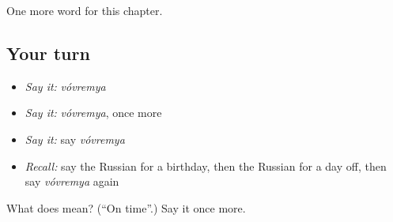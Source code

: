 \begin{grammarlens}[title={What you've built}]
One more word for this chapter.
\end{grammarlens}

\subsection*{Your turn}
\begin{itemize}
\raggedright
  \item \emph{Say it:} \emph{vóvremya}
  \item \emph{Say it:} \emph{vóvremya}, once more
  \item \emph{Say it:} say \emph{vóvremya}
  \item \emph{Recall:} say the Russian for a birthday, then the Russian for a day off, then say \emph{vóvremya} again
\end{itemize}

\begin{tcolorbox}[breakable,colback=teal!4,colframe=teal!35!black,title={Before you move on}]
What does  mean? (\textquotedblleft{}On time\textquotedblright{}.) Say it once more.
\end{tcolorbox}
